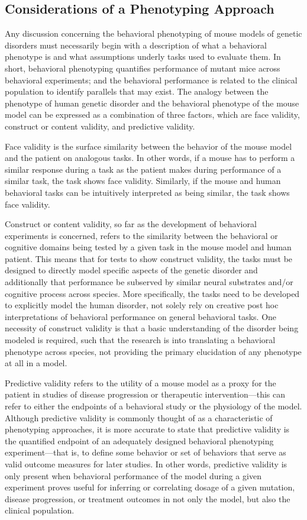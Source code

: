 \documentclass{article}
\begin{document}
\subsection{Considerations of a Phenotyping Approach}
Any discussion concerning the behavioral phenotyping of mouse models of genetic disorders must necessarily begin with a description of what a behavioral phenotype is and what assumptions underly tasks used to evaluate them. In short, behavioral phenotyping quantifies performance of mutant mice across behavioral experiments; and the behavioral performance is related to the clinical population to identify parallels that may exist. The analogy between the phenotype of human genetic disorder and the behavioral phenotype of the mouse model can be expressed as a combination of three factors, which are face validity, construct or content validity, and predictive validity.

Face validity is the surface similarity between the behavior of the mouse model and the patient on analogous tasks. In other words, if a mouse has to perform a similar response during a task as the patient makes during performance of a similar task, the task shows face validity. Similarly, if the mouse and human behavioral tasks can be intuitively interpreted as being similar, the task shows face validity.

Construct or content validity, so far as the development of behavioral experiments is concerned, refers to the similarity between the behavioral or cognitive domains being tested by a given task in the mouse model and human patient. This means that for tests to show construct validity, the tasks must be designed to directly model specific aspects of the genetic disorder and additionally that performance be subserved by similar neural substrates and/or cognitive process across species. More specifically, the tasks need to be developed to explicitly model the human disorder, not solely rely on creative post hoc interpretations of behavioral performance on general behavioral tasks. One necessity of construct validity is that a basic understanding of the disorder being modeled is required, such that the research is into translating a behavioral phenotype across species, not providing the primary elucidation of any phenotype at all in a model.

Predictive validity refers to the utility of a mouse model as a proxy for the patient in studies of disease progression or therapeutic intervention—this can refer to either the endpoints of a behavioral study or the physiology of the model. Although predictive validity is commonly thought of as a characteristic of phenotyping approaches, it is more accurate to state that predictive validity is the quantified endpoint of an adequately
designed behavioral phenotyping experiment—that is, to define some behavior or set of behaviors that serve as valid outcome measures for later studies. In other words, predictive validity is only present when behavioral performance of the model during a given experiment proves useful for inferring or correlating dosage of a given mutation, disease progression, or treatment outcomes in not only the model, but also the clinical population.
\end{document}
